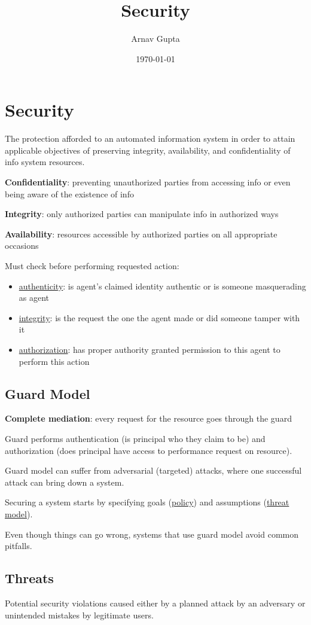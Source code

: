 \documentclass[11pt]{article}
\author{Arnav Gupta}
\date{\today}
\title{Security}
\begin{document}
\maketitle
\tableofcontents

\section{Security}
\label{sec:orgb64db43}
The protection afforded to an automated information system in order to attain applicable
objectives of preserving integrity, availability, and confidentiality of info
system resources.

\textbf{Confidentiality}: preventing unauthorized parties from accessing info or even being
aware of the existence of info

\textbf{Integrity}: only authorized parties can manipulate info in authorized ways

\textbf{Availability}: resources accessible by authorized parties on all appropriate
occasions

Must check before performing requested action:
\begin{itemize}
\item \uline{authenticity}: is agent's claimed identity authentic or is someone
masquerading as agent
\item \uline{integrity}: is the request the one the agent made or did someone tamper
with it
\item \uline{authorization}: has proper authority granted permission to this agent to
perform this action
\end{itemize}
\subsection{Guard Model}
\label{sec:org79c668e}
\textbf{Complete mediation}: every request for the resource goes through the guard

Guard performs authentication (is principal who they claim to be) and
authorization (does principal have access to performance request on
resource).

Guard model can suffer from adversarial (targeted) attacks, where one
successful attack can bring down a system.

Securing a system starts by specifying goals (\uline{policy}) and
assumptions (\uline{threat model}).

Even though things can go wrong, systems that use guard model avoid
common pitfalls.
\subsection{Threats}
\label{sec:org28d9622}
Potential security violations caused either by a planned attack by an
adversary or unintended mistakes by legitimate users.
\end{document}
